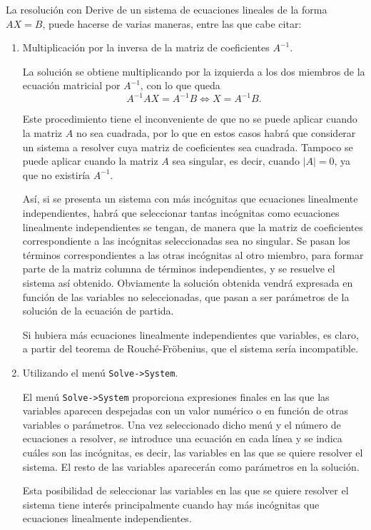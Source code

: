 \documentclass[a4paper]{article}
\begin{document}
La resolución con Derive de un sistema de ecuaciones lineales de la forma $AX=B$, puede hacerse de varias maneras, entre las que cabe citar:

\begin{enumerate}

\item Multiplicación por la inversa de la matriz de coeficientes $A^{-1}$.

La solución se obtiene multiplicando por la izquierda a los dos miembros de la ecuación matricial por $A^{-1}$, con lo que queda 
\[A^{-1}AX=A^{-1}B \Leftrightarrow X=A^{-1}B.\]

Este procedimiento tiene el inconveniente de que no se puede aplicar cuando la matriz $A$ no sea cuadrada, por lo que en estos casos habrá que considerar un sistema a resolver cuya matriz de coeficientes sea cuadrada. Tampoco se puede aplicar cuando la matriz $A$ sea singular, es decir, cuando $|A|=0$, ya que no existiría $A^{-1}$. 

Así, si se presenta un sistema con más incógnitas que ecuaciones linealmente independientes, habrá que seleccionar tantas incógnitas como ecuaciones linealmente independientes se tengan, de manera que la matriz de coeficientes correspondiente a las incógnitas seleccionadas sea no singular. Se pasan los términos correspondientes a las otras incógnitas al otro miembro, para formar parte de la matriz columna de términos independientes, y se resuelve el sistema así obtenido. Obviamente la solución obtenida vendrá expresada en función de las variables no seleccionadas, que pasan a ser parámetros de la solución de la ecuación de partida.

Si hubiera más ecuaciones linealmente independientes que variables, es claro, a partir del teorema de Rouché-Fröbenius, que el sistema sería incompatible.

 
\item Utilizando el menú \texttt{Solve->System}.

El menú \texttt{Solve->System} proporciona expresiones finales en las que las variables aparecen despejadas con un valor numérico o en función de otras variables o parámetros. Una vez seleccionado dicho menú y el número de ecuaciones a resolver, se introduce una ecuación en cada línea y se indica cuáles son las incógnitas, es decir, las variables en las que se quiere resolver el sistema. El resto de las variables aparecerán como parámetros en la solución.

Esta posibilidad de seleccionar las variables en las que se quiere resolver el sistema tiene interés principalmente cuando hay más incógnitas que ecuaciones linealmente independientes. 


\end{enumerate}
\end{document}
